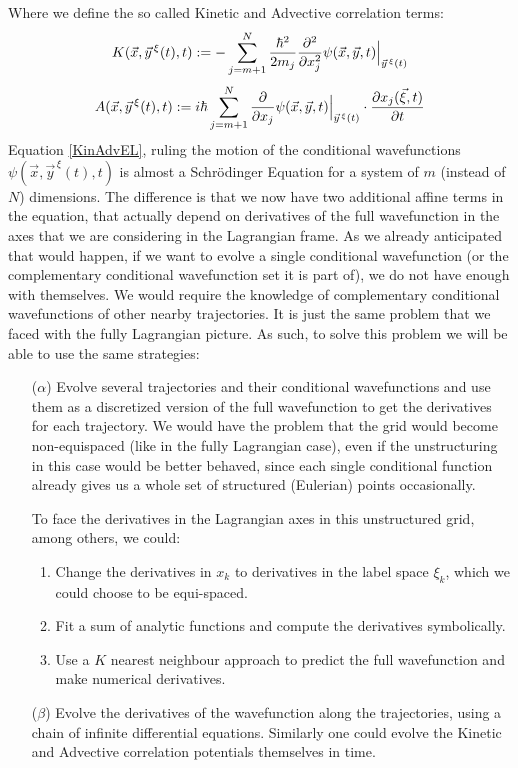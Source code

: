 \documentclass[11pt, a4paper]{article} %
\begin{document}
Where we define the so called Kinetic and Advective correlation terms:
\begin{equation}\label{KinEL}
K(\vec{x}, \vec{y}^{\, \xi}(t),t):=-\sum_{j=m+1}^N \frac{\hbar^2}{2m_j}\pdv[2]{}{x_j} \psi(\vec{x}, \vec{y},t)\Big\rvert_{\vec{y}^{\, \xi}(t)}
\end{equation}
\begin{equation}\label{AdvEL}
A(\vec{x}, \vec{y}^{\, \xi}(t),t):=i\hbar\sum_{j=m+1}^N \pdv{}{x_j}\psi(\vec{x}, \vec{y},t)\Big\rvert_{\vec{y}^{\, \xi}(t)}\cdot \pdv{x_j(\vec{\xi},t)}{t}
\end{equation}
Equation \eqref{KinAdvEL}, ruling the motion of the conditional wavefunctions $\psi(\vec{x}, \vec{y}^{\, \xi}(t),t)$ is almost a Schrödinger Equation for a system of $m$ (instead of $N$) dimensions. The difference is that we now have two additional affine terms in the equation, that actually depend on derivatives of the full wavefunction in the axes that we are considering in the Lagrangian frame. As we already anticipated that would happen, if we want to evolve a single conditional wavefunction (or the complementary conditional wavefunction set it is part of), we do not have enough with themselves. We would require the knowledge of complementary conditional wavefunctions of other nearby trajectories. It is just the same problem that we faced with the fully Lagrangian picture. As such, to solve this problem we will be able to use the same strategies: 
\begin{enumerate}
\item[($\alpha$)] Evolve several trajectories and their conditional wavefunctions and use them as a discretized version of the full wavefunction to get the derivatives for each trajectory. We would have the problem that the grid would become non-equispaced (like in the fully Lagrangian case), even if the unstructuring in this case would be better behaved, since each single conditional function already gives us a whole set of structured (Eulerian) points occasionally.

To face the derivatives in the Lagrangian axes in this unstructured grid, among others, we could:
\begin{enumerate}
\item Change the derivatives in $x_k$ to derivatives in the label space $\xi_k$, which we could choose to be equi-spaced.
\item Fit a sum of analytic functions and compute the derivatives symbolically.
\item Use a $K$ nearest neighbour approach to predict the full wavefunction and make numerical derivatives.
\end{enumerate}

\item[($\beta$)] Evolve the derivatives of the wavefunction along the trajectories, using a chain of infinite differential equations. Similarly one could evolve the Kinetic and Advective correlation potentials themselves in time.
\end{enumerate}
\end{document}
